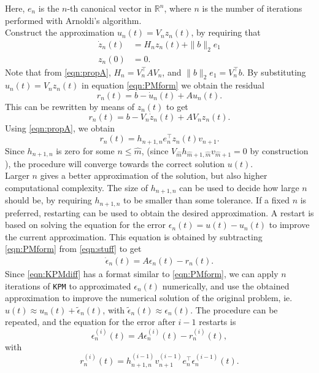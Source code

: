 \noindent Here, $e_{n}$ is the $n$-th canonical vector in $\mathbb{R}^{n}$, where $n$ is the number of iterations performed with Arnoldi's algorithm.\\

\noindent Construct the approximation $u_n(t) = V_n z_n(t)$, by requiring that
\begin{equation}
\begin{aligned}
\dot{z}_n(t) &= H_n z_n(t) + \| b \|_2 e_1\\
z_n(0) &= 0.
\end{aligned}
\label{eqn:stuff}
\end{equation}
Note that from \eqref{eqn:propA}, $H_n = V_n^\top A V_n$, and $\|b \|_2 e_1 = V_n^\top b$. By substituting $u_n(t) = V_n z_n(t)$ in equation \eqref{eqn:PMform} we obtain the residual
\begin{equation*}
r_n(t) = b -\dot{u}_n(t) + A u_n(t).
\end{equation*}
This can be rewritten by means of $z_n(t)$ to get
\begin{equation*}
r_n(t) = b - V_n \dot{z}_n(t) + A V_n z_n(t).
\end{equation*}
Using \eqref{eqn:propA}, we obtain
\begin{equation}
r_n(t) = h_{n+1,n} e_n^\top z_n(t) v_{n+1}.
\label{eqn:Aresidual}
\end{equation}
\noindent Since $h_{n+1,n}$ is zero for some $n \leq \hat{m}$, (since $V_{\hat{m}} h_{\hat{m}+1,\hat{m}} v_{\hat{m}+1} = 0 $ by construction \cite{arnoldconv}), the procedure will converge towards the correct solution $u(t)$. \\

\noindent Larger $n$ gives a better approximation of the solution, but also higher computational complexity. The size of $h_{n+1,n}$ can be used to decide how large $n$ should be, by requiring $h_{n+1,n} $ to be smaller than some tolerance. If a fixed $n$ is preferred, restarting can be used to obtain the desired approximation.
\noindent A restart is based on solving the equation for the error $\epsilon_n(t) = u(t)-u_n(t)$ to improve the current approximation. This equation is obtained by subtracting \eqref{eqn:PMform} from \eqref{eqn:stuff} to get
\begin{equation}
\begin{aligned}
\dot{\epsilon}_n(t)=A \epsilon_n (t)  - r_n(t).
\end{aligned}
\label{eqn:KPMdiff}
\end{equation}
Since \eqref{eqn:KPMdiff} has a format similar to \eqref{eqn:PMform}, we can apply $n$ iterations of \texttt{KPM} to approximated $\epsilon_n(t)$ numerically, and use the obtained approximation to improve the numerical solution of the original problem, ie. $u(t) \approx u_n(t) + \tilde{\epsilon}_n(t)$, with $\tilde{\epsilon}_n(t) \approx \epsilon_n(t)$. The procedure can be repeated, and the equation for the error after $i-1$ restarts is $$\epsilon_n^{(i)}(t) = A\epsilon_n^{(i)}(t) - r_n^{(i)}(t),$$ with $$ r_n^{(i)}(t) = h_{n+1,n}^{(i-1)} v_{n+1}^{(i-1)} e_n^{\top} \epsilon_n^{(i-1)} (t). $$

